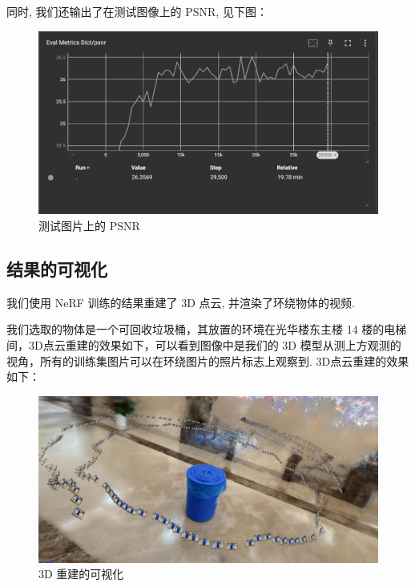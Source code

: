 \documentclass[notitlepage,cs4size,punct,oneside]{ctexrep}
\numberwithin{equation}{chapter}
\theoremstyle{mystyle}
\begin{document}
同时, 我们还输出了在测试图像上的 PSNR, 见下图：
\begin{figure}[H]
    \centering
    \includegraphics[width=1\linewidth]{psnr.png}
    \caption{测试图片上的 PSNR}
    \label{fig:enter-label}
\end{figure}

\subsection{结果的可视化}

我们使用 NeRF 训练的结果重建了 3D 点云, 并渲染了环绕物体的视频.

我们选取的物体是一个可回收垃圾桶，其放置的环境在光华楼东主楼 14 楼的电梯间，3D点云重建的效果如下，可以看到图像中是我们的 3D 模型从测上方观测的视角，所有的训练集图片可以在环绕图片的照片标志上观察到. 3D点云重建的效果如下：

\begin{figure}[H]
    \centering
    \includegraphics[width=1\linewidth]{3drecon.png}
    \caption{3D 重建的可视化}
    \label{fig:enter-label}
\end{figure}
\end{document}

